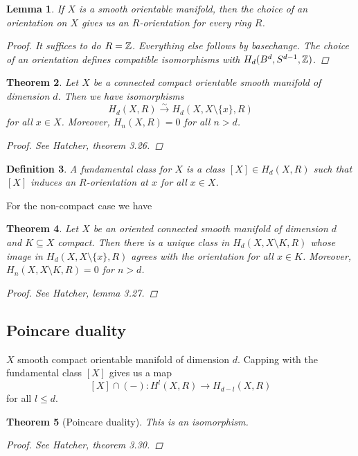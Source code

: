 \documentclass[A4paper, british]{amsart}
\theoremstyle{darkgreentheorem}
\newtheorem{thm}{Theorem}[section]
\newtheorem{lm}[thm]{Lemma}
\theoremstyle{darkbluedefinition}
\newtheorem{defn}[thm]{Definition}
\theoremstyle{darkredexample}
\theoremstyle{remark}
\newcommand{\1}{\mathbbm{1}}
\newcommand{\sub}{\subseteq}
\begin{document}
\begin{lm}
    If $X$ is a smooth orientable manifold, then the choice of an orientation on $X$ gives us an $R$-orientation for every ring $R$.
    \begin{proof}
	It suffices to do $R=\mathbb{Z}$.
	Everything else follows by basechange.
	The choice of an orientation defines compatible isomorphisms with $H_{d}(B^{d},S^{d-1},\mathbb{Z})$.
    \end{proof}
\end{lm}

\begin{thm}
    Let $X$ be a connected compact orientable smooth manifold of dimension $d$.
    Then we have isomorphisms
    \[ H_{d}(X,R)\xrightarrow{\sim} H_{d}(X,X\setminus \{x\},R) \]
    for all $x\in X$.
    Moreover, $H_{n}(X,R)=0$ for all $n>d$.
    \begin{proof}
	See Hatcher, theorem 3.26.
    \end{proof}
\end{thm}

\begin{defn}
    A \textit{fundamental class} for $X$ is a class $[X]\in H_{d}(X,R)$ such that $[X]$ induces an $R$-orientation at $x$ for all $x\in X$.
\end{defn}

For the non-compact case we have

\begin{thm}
    Let $X$ be an oriented connected smooth manifold of dimension $d$ and $K\sub X$ compact.
    Then there is a unique class in $H_{d}(X,X\setminus K,R)$ whose image in $H_{d}(X,X\setminus\{x\},R)$ agrees with the orientation for all $x\in K$.
    Moreover, $H_{n}(X,X\setminus K,R)=0$ for $n>d$.
    \begin{proof}
	See Hatcher, lemma 3.27.
    \end{proof}
\end{thm}

\subsection{Poincare duality}

$X$ smooth compact orientable manifold of dimension $d$.
Capping with the fundamental class $[X]$ gives us a map
\[ [X]\cap (-)\colon H^{l}(X,R)\to H_{d-l}(X,R) \]
for all $l\leqslant d$.

\begin{thm}[Poincare duality]
    This is an isomorphism.
    \begin{proof}
	See Hatcher, theorem 3.30.
    \end{proof}
\end{thm}
\end{document}
